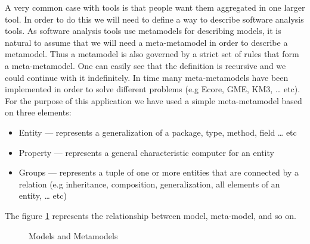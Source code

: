 	A very common case with tools is that people want them aggregated in one larger
tool. In order to do this we will need to define a way to describe software
analysis tools. As software analysis tools use metamodels for describing models,
it is natural to assume that we will need a meta-metamodel in order to describe
a metamodel. Thus a metamodel is also governed by a strict set of rules that form
a meta-metamodel. One can easily see that the definition is recursive and we
could continue with it indefinitely. In time many meta-metamodels have been
implemented in order to solve different problems (e.g Ecore, GME, KM3, \ldots{}
etc). For the purpose of this application we have used a simple
meta-metamodel\cite{thesis:CristianCaloghera} based on three elements: 
	\begin{itemize}
		\item Entity --- represents a generalization of a package, type, method, 
field \ldots{} etc
 
		\item Property --- represents a general characteristic computer for an entity
		\item Groups --- represents a tuple of one or more entities that are connected
by a relation (e.g inheritance, composition, generalization, all elements of an
entity, \ldots{} etc)
	\end{itemize}
	
	The figure \ref{fig:metamodel} represents the relationship between model,
meta-model, and so on.
	 

\begin{figure}
\centering
{}
\caption{Models and Metamodels\label{fig:metamodel}}
\end{figure}

